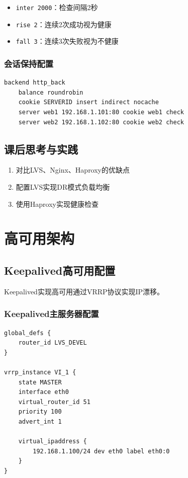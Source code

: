 \documentclass[12pt,UTF8]{ctexbook}
\begin{document}
\begin{itemize}
    \item \texttt{inter 2000}：检查间隔2秒
    \item \texttt{rise 2}：连续2次成功视为健康
    \item \texttt{fall 3}：连续3次失败视为不健康
\end{itemize}

\subsection*{会话保持配置}
\begin{lstlisting}
backend http_back
    balance roundrobin
    cookie SERVERID insert indirect nocache
    server web1 192.168.1.101:80 cookie web1 check
    server web2 192.168.1.102:80 cookie web2 check
\end{lstlisting}

\section{课后思考与实践}
\label{sec:lb-practice}
\begin{enumerate}
    \item 对比LVS、Nginx、Haproxy的优缺点
    \item 配置LVS实现DR模式负载均衡
    \item 使用Haproxy实现健康检查
\end{enumerate}

\chapter{高可用架构}
\label{chap:high-availability}

\section{Keepalived高可用配置}
\label{sec:keepalived}

Keepalived实现高可用通过VRRP协议实现IP漂移。

\subsection*{Keepalived主服务器配置}
\begin{lstlisting}
global_defs {
    router_id LVS_DEVEL
}

vrrp_instance VI_1 {
    state MASTER
    interface eth0
    virtual_router_id 51
    priority 100
    advert_int 1
    
    virtual_ipaddress {
        192.168.1.100/24 dev eth0 label eth0:0
    }
}
\end{lstlisting}
\end{document}
